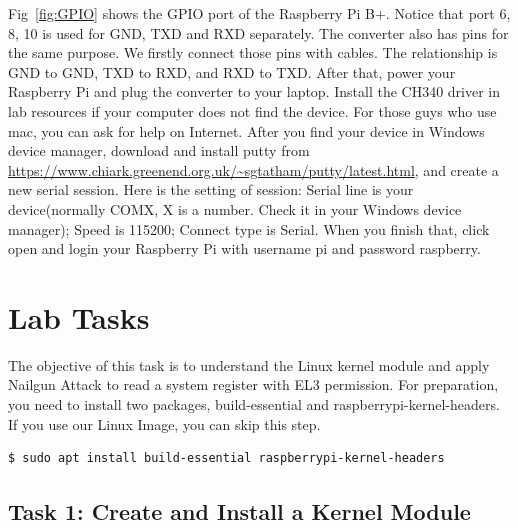 Fig~\ref{fig:GPIO} shows the GPIO port of the Raspberry Pi B+. Notice that port 6, 8, 10 is used for GND, TXD and RXD separately. The converter also has pins for the same purpose. We firstly connect those pins with cables. The relationship is GND to GND, TXD to RXD, and RXD to TXD. After that, power your Raspberry Pi and plug the converter to your laptop. Install the CH340 driver in lab resources if your computer does not find the device. For those guys who use mac, you can ask for help on Internet. After you find your device in Windows device manager, download and install putty from \url{https://www.chiark.greenend.org.uk/~sgtatham/putty/latest.html}, and create a new serial session. Here is the setting of session: Serial line is your device(normally COMX, X is a number. Check it in your Windows device manager); Speed is 115200; Connect type is Serial.
When you finish that, click open and login your Raspberry Pi with username pi and password raspberry. 


% 
\section{Lab Tasks}

The objective of this task is to understand the Linux kernel module and apply Nailgun Attack to read a system register with EL3 permission. For
preparation, you need to install two packages, build-essential and
raspberrypi-kernel-headers. If you use our Linux Image, you can skip this step.

\begin{lstlisting}
$ sudo apt install build-essential raspberrypi-kernel-headers
\end{lstlisting}

\subsection{Task 1: Create and Install a Kernel Module}

